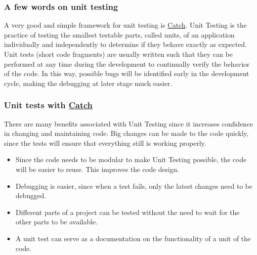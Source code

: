 \documentclass{beamer}
\begin{document}
\begin{frame}
\frametitle{A few words on unit testing}

A very good and simple framework for unit testing is \href{{https://github.com/philsquared/Catch}}{Catch}.
Unit Testing is the practice of testing the smallest testable parts,
called units, of an application individually and independently to
determine if they behave exactly as expected. Unit tests (short code
fragments) are usually written such that they can be performed at any
time during the development to continually verify the behavior of the
code. In this way, possible bugs will be identified early in the
development cycle, making the debugging at later stage much
easier.
\end{frame}

\begin{frame}
\frametitle{Unit tests with \href{{https://github.com/philsquared/Catch}}{Catch}}

There are many benefits associated with Unit Testing since it  increases confidence in changing and maintaining code. Big changes can be made to the code quickly, since the tests will ensure that everything still is working properly.
\begin{itemize}
 \item Since the code needs to be modular to make Unit Testing possible, the code will be easier to reuse. This improves the code design.

 \item Debugging is easier, since when a test fails, only the latest changes need to be debugged.

 \item Different parts of a project can be tested without the need to wait for the other parts to be available.

 \item A unit test can serve as a documentation on the functionality of a unit of the code.
\end{itemize}

\noindent
\end{frame}
\end{document}
